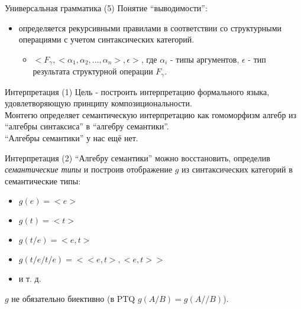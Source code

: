 \documentclass{beamer}
\begin{document}
\begin{frame}{Универсальная грамматика (5)}
Понятие ``выводимости'':\\
\begin{itemize}
  \item определяется рекурсивными правилами в соответствии со структурными операциями с учетом синтаксических категорий.
    \begin{itemize}
      \item $< \! F_\gamma, < \! \alpha_1, \alpha_2, ... , \alpha_n \! >, \epsilon \!>$, где $\alpha_i$ - типы аргументов, $\epsilon$ - тип результата структурной операции $F_\gamma$.
    \end{itemize}
\end{itemize}
\end{frame}

\begin{frame}{Интерпретация (1)}
Цель - построить интерпретацию формального языка, удовлетворяющую принципу композициональности.\\
\bigskip
Монтегю определяет семантическую интерпретацию как гомоморфизм алгебр из ``алгебры синтаксиса'' в ``алгебру семантики''.\\
\bigskip
``Алгебры семантики'' у нас ещё нет.
\end{frame}

\begin{frame}{Интерпретация (2)}
``Алгебру семантики'' можно восстановить, определив \textit{семантические типы} и построив 
отображение $g$ из синтаксических категорий в семантические типы:\\
\bigskip
\begin{itemize}
  \item $g(e) = < \! e \! >$
  \item $g(t) = < \! t \! >$
  \item $g(t/e) = < \! e, t \! >$
  \item $g(t/e/t/e) = < \! < \! e, t \! >, < \! e, t \! > \! >$
  \item и т. д.
\end{itemize}
\bigskip
$g$ не обязательно биективно (в PTQ $g(A/B) = g(A//B)$).
\end{frame}
\end{document}

